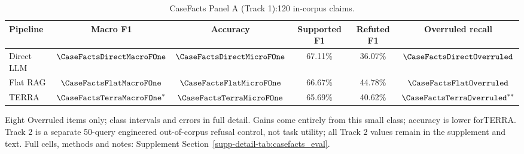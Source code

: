 \begin{table}[!t]
\caption{CaseFacts Panel A (Track 1):120 in-corpus claims.}
\label{tab:casefacts_eval}
\centering\begingroup\fontsize{8}{9.6}\selectfont\setlength{\tabcolsep}{3pt}\renewcommand{\arraystretch}{1.15}
\begin{tabular}{lccccc}
\toprule
Pipeline & Macro F1 & Accuracy & Supported F1 & Refuted F1 & Overruled recall \\
\midrule
Direct LLM & $\CaseFactsDirectMacroFOne$ & $\CaseFactsDirectMicroFOne$ & 67.11\% & 36.07\% & $\CaseFactsDirectOverruled$ \\
Flat RAG & $\CaseFactsFlatMacroFOne$ & $\CaseFactsFlatMicroFOne$ & 66.67\% & 44.78\% & $\CaseFactsFlatOverruled$ \\
TERRA & $\CaseFactsTerraMacroFOne^*$ & $\CaseFactsTerraMicroFOne$ & 65.69\% & 40.62\% & $\CaseFactsTerraOverruled^{**}$ \\
\bottomrule
\end{tabular}
\endgroup\par\vspace{2pt}
\raggedright\footnotesize Eight Overruled items only; class intervals and errors in full detail. Gains come entirely from this small class; accuracy is lower forTERRA. Track 2 is a separate 50-query engineered out-of-corpus refusal control, not task utility; all Track 2 values remain in the supplement and text. Full cells, methods and notes: Supplement Section~\ref{supp-detail-tab:casefacts_eval}.
\end{table}
